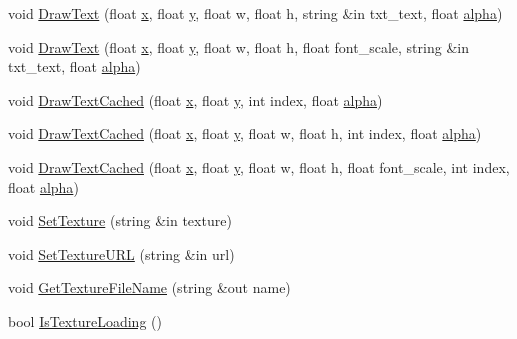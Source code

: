 \begin{DoxyCompactItemize}
\item 
void \hyperlink{class_g_u_i_label_aa26b1fae9188de6084e94124ad6a15dd}{Draw\+Text} (float \hyperlink{class_g_u_i_label_afc04a00a1336cec1bb6a94f62443e51b}{x}, float \hyperlink{class_g_u_i_label_aa302d2303602c024f203dda2ac6de0d9}{y}, float w, float h, string \&in txt\+\_\+text, float \hyperlink{class_g_u_i_label_a033d064957f88cd4ebcea6c483af6984}{alpha})
\item 
void \hyperlink{class_g_u_i_label_ac6ba139bbe96a919874a21edf6e15fb3}{Draw\+Text} (float \hyperlink{class_g_u_i_label_afc04a00a1336cec1bb6a94f62443e51b}{x}, float \hyperlink{class_g_u_i_label_aa302d2303602c024f203dda2ac6de0d9}{y}, float w, float h, float font\+\_\+scale, string \&in txt\+\_\+text, float \hyperlink{class_g_u_i_label_a033d064957f88cd4ebcea6c483af6984}{alpha})
\item 
void \hyperlink{class_g_u_i_label_a0c350aa1033f7782beb6c681230eabe8}{Draw\+Text\+Cached} (float \hyperlink{class_g_u_i_label_afc04a00a1336cec1bb6a94f62443e51b}{x}, float \hyperlink{class_g_u_i_label_aa302d2303602c024f203dda2ac6de0d9}{y}, int index, float \hyperlink{class_g_u_i_label_a033d064957f88cd4ebcea6c483af6984}{alpha})
\item 
void \hyperlink{class_g_u_i_label_aa0ea22ea58afca04574f83f42e3922c5}{Draw\+Text\+Cached} (float \hyperlink{class_g_u_i_label_afc04a00a1336cec1bb6a94f62443e51b}{x}, float \hyperlink{class_g_u_i_label_aa302d2303602c024f203dda2ac6de0d9}{y}, float w, float h, int index, float \hyperlink{class_g_u_i_label_a033d064957f88cd4ebcea6c483af6984}{alpha})
\item 
void \hyperlink{class_g_u_i_label_a17cec9620d45ce98ae2020684b6d18b1}{Draw\+Text\+Cached} (float \hyperlink{class_g_u_i_label_afc04a00a1336cec1bb6a94f62443e51b}{x}, float \hyperlink{class_g_u_i_label_aa302d2303602c024f203dda2ac6de0d9}{y}, float w, float h, float font\+\_\+scale, int index, float \hyperlink{class_g_u_i_label_a033d064957f88cd4ebcea6c483af6984}{alpha})
\item 
void \hyperlink{class_g_u_i_label_a461c33dadf91124cc3a9b6d66a9cd000}{Set\+Texture} (string \&in texture)
\item 
void \hyperlink{class_g_u_i_label_a0ab6d355c6e465f80299d08edf98da87}{Set\+Texture\+U\+RL} (string \&in url)
\item 
void \hyperlink{class_g_u_i_label_a72ab3d28c1313a3d66b8609a547d0f38}{Get\+Texture\+File\+Name} (string \&out name)
\item 
bool \hyperlink{class_g_u_i_label_aa09ab389aed05ee5ad454ebb4366bd59}{Is\+Texture\+Loading} ()

\end{DoxyCompactItemize}

